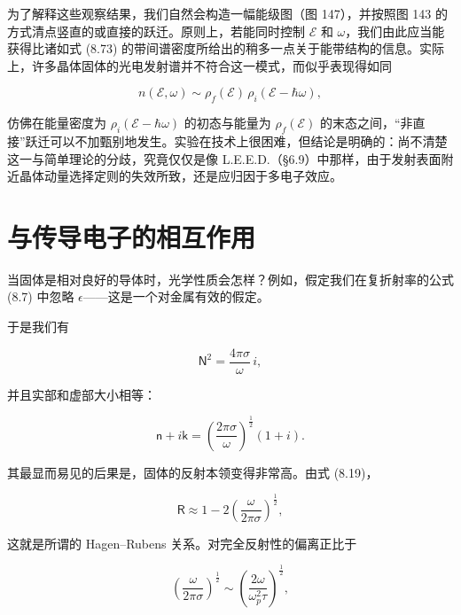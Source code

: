 为了解释这些观察结果，我们自然会构造一幅能级图（图 147），并按照图 143 的方式清点竖直的或直接的跃迁。原则上，若能同时控制 $\mathcal{E}$ 和 $\omega$，我们由此应当能获得比诸如式 (8.73) 的带间谱密度所给出的稍多一点关于能带结构的信息。实际上，许多晶体固体的光电发射谱并不符合这一模式，而似乎表现得如同

\begin{equation*}
n(\mathcal{E},\omega) \sim \rho_f(\mathcal{E})\,\rho_i(\mathcal{E}-\hbar\omega),
\tag{8.78}
\end{equation*}

仿佛在能量密度为 $\rho_i(\mathcal{E}-\hbar\omega)$ 的初态与能量为 $\rho_f(\mathcal{E})$ 的末态之间，“非直接”跃迁可以不加甄别地发生。实验在技术上很困难，但结论是明确的：尚不清楚这一与简单理论的分歧，究竟仅仅是像 L.E.E.D.（§6.9）中那样，由于发射表面附近晶体动量选择定则的失效所致，还是应归因于多电子效应。


\section{与传导电子的相互作用}

当固体是相对良好的导体时，光学性质会怎样？例如，假定我们在复折射率的公式 (8.7) 中忽略 $\epsilon$——这是一个对金属有效的假定。

于是我们有

\begin{equation*}
\mathsf{N}^2 = \frac{4\pi\sigma}{\omega}\, i,
\tag{8.79}
\end{equation*}

并且实部和虚部大小相等：

\begin{equation*}
\mathsf{n} + i\mathsf{k} = \left(\frac{2\pi\sigma}{\omega}\right)^{\frac{1}{2}}(1+i).
\tag{8.80}
\end{equation*}

其最显而易见的后果是，固体的反射本领变得非常高。由式 (8.19)，

\begin{equation*}
\mathsf{R} \approx 1 - 2\left(\frac{\omega}{2\pi\sigma}\right)^{\frac{1}{2}},
\tag{8.81}
\end{equation*}

这就是所谓的 Hagen--Rubens 关系。对完全反射性的偏离正比于

\begin{equation*}
\left(\frac{\omega}{2\pi\sigma}\right)^{\frac{1}{2}} \sim \left(\frac{2\omega}{\omega_p^2\tau}\right)^{\frac{1}{2}},
\tag{8.82}
\end{equation*}

